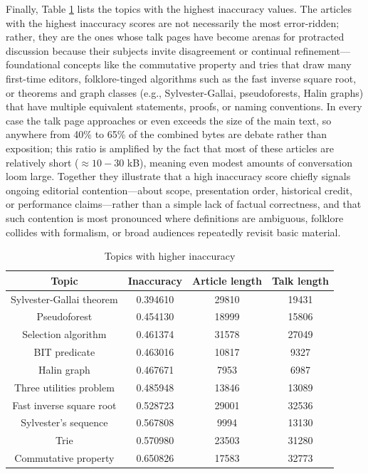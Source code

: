 Finally, Table \ref{tab:Higher-inaccuracy-of-topics} lists the topics with the highest inaccuracy values. The articles with the highest inaccuracy scores are not necessarily the most error-ridden; rather, they are the ones whose talk pages have become arenas for protracted discussion because their subjects invite disagreement or continual refinement—foundational concepts like the commutative property and tries that draw many first-time editors, folklore-tinged algorithms such as the fast inverse square root, or theorems and graph classes (e.g., Sylvester-Gallai, pseudoforests, Halin graphs) that have multiple equivalent statements, proofs, or naming conventions.  In every case the talk page approaches or even exceeds the size of the main text, so anywhere from 40\% to 65\% of the combined bytes are debate rather than exposition; this ratio is amplified by the fact that most of these articles are relatively short ($\approx 10-30$ kB), meaning even modest amounts of conversation loom large.  Together they illustrate that a high inaccuracy score chiefly signals ongoing editorial contention—about scope, presentation order, historical credit, or performance claims—rather than a simple lack of factual correctness, and that such contention is most pronounced where definitions are ambiguous, folklore collides with formalism, or broad audiences repeatedly revisit basic material.

\begin{table}
\begin{centering}
\begin{tabular}{|c|c|c|c|}
\hline 
Topic & Inaccuracy & Article length & Talk length \tabularnewline
\hline 
\hline 
Sylvester-Gallai theorem & 0.394610 & 29810 & 19431 \tabularnewline
\hline
Pseudoforest & 0.454130 & 18999 & 15806 \tabularnewline
\hline
Selection algorithm & 0.461374 & 31578 & 27049 \tabularnewline
\hline
BIT predicate & 0.463016 & 10817 & 9327 \tabularnewline
\hline
Halin graph & 0.467671 & 7953 & 6987 \tabularnewline
\hline
Three utilities problem & 0.485948 & 13846 & 13089 \tabularnewline
\hline
Fast inverse square root & 0.528723 & 29001 & 32536 \tabularnewline
\hline
Sylvester's sequence & 0.567808 & 9994 & 13130 \tabularnewline
\hline
Trie & 0.570980 & 23503 & 31280 \tabularnewline
\hline
Commutative property & 0.650826 & 17583 & 32773 \tabularnewline
\hline 
\end{tabular}
\par\end{centering}
\caption{\label{tab:Higher-inaccuracy-of-topics}Topics with higher inaccuracy}
\end{table}

